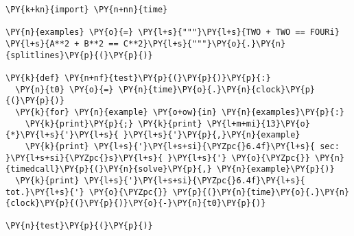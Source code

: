 \begin{Verbatim}[commandchars=\\\{\}]
\PY{k+kn}{import} \PY{n+nn}{time}

\PY{n}{examples} \PY{o}{=} \PY{l+s}{"""}\PY{l+s}{TWO + TWO == FOURi}
\PY{l+s}{A**2 + B**2 == C**2}\PY{l+s}{"""}\PY{o}{.}\PY{n}{splitlines}\PY{p}{(}\PY{p}{)}

\PY{k}{def} \PY{n+nf}{test}\PY{p}{(}\PY{p}{)}\PY{p}{:}
  \PY{n}{t0} \PY{o}{=} \PY{n}{time}\PY{o}{.}\PY{n}{clock}\PY{p}{(}\PY{p}{)}
  \PY{k}{for} \PY{n}{example} \PY{o+ow}{in} \PY{n}{examples}\PY{p}{:}
    \PY{k}{print}\PY{p}{;} \PY{k}{print} \PY{l+m+mi}{13}\PY{o}{*}\PY{l+s}{'}\PY{l+s}{ }\PY{l+s}{'}\PY{p}{,}\PY{n}{example}
    \PY{k}{print} \PY{l+s}{'}\PY{l+s+si}{\PYZpc{}6.4f}\PY{l+s}{ sec:   }\PY{l+s+si}{\PYZpc{}s}\PY{l+s}{ }\PY{l+s}{'} \PY{o}{\PYZpc{}} \PY{n}{timedcall}\PY{p}{(}\PY{n}{solve}\PY{p}{,} \PY{n}{example}\PY{p}{)}
  \PY{k}{print} \PY{l+s}{'}\PY{l+s+si}{\PYZpc{}6.4f}\PY{l+s}{ tot.}\PY{l+s}{'} \PY{o}{\PYZpc{}} \PY{p}{(}\PY{n}{time}\PY{o}{.}\PY{n}{clock}\PY{p}{(}\PY{p}{)}\PY{o}{-}\PY{n}{t0}\PY{p}{)}

\PY{n}{test}\PY{p}{(}\PY{p}{)}
\end{Verbatim}
